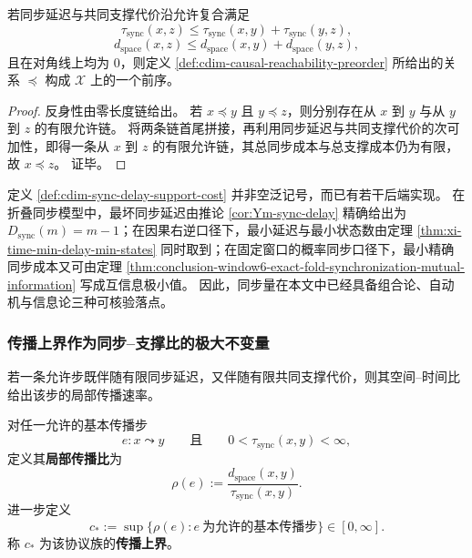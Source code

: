 \begin{proposition}[同步与共同支撑诱导的因果前序]\label{prop:cdim-causal-preorder-from-subadditivity}
若同步延迟与共同支撑代价沿允许复合满足
\[
\tau_{\mathrm{sync}}(x,z)
\le
\tau_{\mathrm{sync}}(x,y)+\tau_{\mathrm{sync}}(y,z),
\]
\[
d_{\mathrm{space}}(x,z)
\le
d_{\mathrm{space}}(x,y)+d_{\mathrm{space}}(y,z),
\]
且在对角线上均为 \(0\)，则定义 \ref{def:cdim-causal-reachability-preorder} 所给出的关系 \(\preceq\) 构成 \(\mathcal X\) 上的一个前序。
\end{proposition}
\begin{proof}
反身性由零长度链给出。
若 \(x\preceq y\) 且 \(y\preceq z\)，则分别存在从 \(x\) 到 \(y\) 与从 \(y\) 到 \(z\) 的有限允许链。
将两条链首尾拼接，再利用同步延迟与共同支撑代价的次可加性，即得一条从 \(x\) 到 \(z\) 的有限允许链，其总同步成本与总支撑成本仍为有限，故 \(x\preceq z\)。
证毕。
\end{proof}

\begin{remark}[当前稿件中的同步接口]\label{rem:cdim-sync-delay-existing-interfaces}
定义 \ref{def:cdim-sync-delay-support-cost} 并非空泛记号，而已有若干后端实现。
在折叠同步模型中，最坏同步延迟由推论 \ref{cor:Ym-sync-delay} 精确给出为 \(D_{\mathrm{sync}}(m)=m-1\)；在因果右逆口径下，最小延迟与最小状态数由定理 \ref{thm:xi-time-min-delay-min-states} 同时取到；在固定窗口的概率同步口径下，最小精确同步成本又可由定理 \ref{thm:conclusion-window6-exact-fold-synchronization-mutual-information} 写成互信息极小值。
因此，同步量在本文中已经具备组合论、自动机与信息论三种可核验落点。
\end{remark}

\subsubsection{传播上界作为同步--支撑比的极大不变量}
若一条允许步既伴随有限同步延迟，又伴随有限共同支撑代价，则其空间--时间比给出该步的局部传播速率。

\begin{definition}[局部传播比与传播上界]\label{def:cdim-local-propagation-ratio}
对任一允许的基本传播步
\[
e:x\leadsto y
\qquad
\text{且}\qquad
0<\tau_{\mathrm{sync}}(x,y)<\infty,
\]
定义其\textbf{局部传播比}为
\[
\rho(e)
:=
\frac{d_{\mathrm{space}}(x,y)}{\tau_{\mathrm{sync}}(x,y)}.
\]
进一步定义
\[
c_*:=\sup\bigl\{\rho(e): e\ \text{为允许的基本传播步}\bigr\}\in[0,\infty].
\]
称 \(c_*\) 为该协议族的\textbf{传播上界}。
\end{definition}

